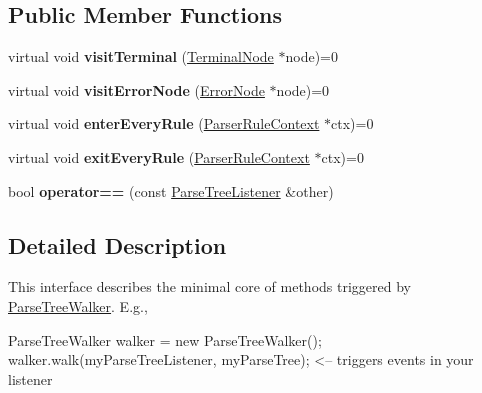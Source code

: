 \subsection*{Public Member Functions}
\begin{DoxyCompactItemize}
\item 
\mbox{\label{classantlr4_1_1tree_1_1ParseTreeListener_a1b18d7e13cb0e59cca877c99115da90f}} 
virtual void {\bfseries visit\+Terminal} (\hyperlink{classantlr4_1_1tree_1_1TerminalNode}{Terminal\+Node} $\ast$node)=0
\item 
\mbox{\label{classantlr4_1_1tree_1_1ParseTreeListener_ad736ceae08c0838ccd34ce716c8ea8cb}} 
virtual void {\bfseries visit\+Error\+Node} (\hyperlink{classantlr4_1_1tree_1_1ErrorNode}{Error\+Node} $\ast$node)=0
\item 
\mbox{\label{classantlr4_1_1tree_1_1ParseTreeListener_adf8725fe1dc794db9b27371350c516dd}} 
virtual void {\bfseries enter\+Every\+Rule} (\hyperlink{classantlr4_1_1ParserRuleContext}{Parser\+Rule\+Context} $\ast$ctx)=0
\item 
\mbox{\label{classantlr4_1_1tree_1_1ParseTreeListener_ab8993be396adf21d7da138f61a8fd38b}} 
virtual void {\bfseries exit\+Every\+Rule} (\hyperlink{classantlr4_1_1ParserRuleContext}{Parser\+Rule\+Context} $\ast$ctx)=0
\item 
\mbox{\label{classantlr4_1_1tree_1_1ParseTreeListener_ae22a09365e3de536613dbe28c03ded9a}} 
bool {\bfseries operator==} (const \hyperlink{classantlr4_1_1tree_1_1ParseTreeListener}{Parse\+Tree\+Listener} \&other)
\end{DoxyCompactItemize}


\subsection{Detailed Description}
This interface describes the minimal core of methods triggered by \hyperlink{classantlr4_1_1tree_1_1ParseTreeWalker}{Parse\+Tree\+Walker}. E.\+g., \begin{DoxyVerb}ParseTreeWalker walker = new ParseTreeWalker();
walker.walk(myParseTreeListener, myParseTree); <-- triggers events in your listener
\end{DoxyVerb}


